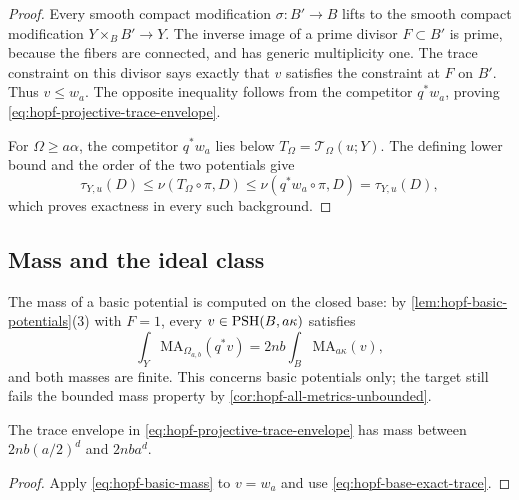 \begin{proof}
Every smooth compact modification $\sigma\colon B'\to B$ lifts to the smooth compact modification $Y\times_B B'\to Y$. The inverse image of a prime divisor $F\subset B'$ is prime, because the fibers are connected, and has generic multiplicity one. The trace constraint on this divisor says exactly that $v$ satisfies the constraint at $F$ on $B'$. Thus $v\leq w_a$. The opposite inequality follows from the competitor $q^*w_a$, proving \eqref{eq:hopf-projective-trace-envelope}.

For $\Omega\geq a\alpha$, the competitor $q^*w_a$ lies below $T_\Omega=\mathcal T_\Omega(u;Y)$. The defining lower bound and the order of the two potentials give
\[
 \tau_{Y,u}(D)\leq\nu(T_\Omega\circ\pi,D)
       \leq\nu(q^*w_a\circ\pi,D)=\tau_{Y,u}(D),
\]
which proves exactness in every such background.
\end{proof}

\subsection{Mass and the ideal class}

The mass of a basic potential is computed on the closed base: by \cref{lem:hopf-basic-potentials}(3) with $F=1$, every $v\in\mathrm{PSH}(B,a\kappa)$ satisfies
\begin{equation}\label{eq:hopf-basic-mass}
 \int_Y\mathrm{MA}_{\Omega_{a,b}}(q^*v)
       =2nb\int_B\mathrm{MA}_{a\kappa}(v),
\end{equation}
and both masses are finite. This concerns basic potentials only; the target still fails the bounded mass property by \cref{cor:hopf-all-metrics-unbounded}.

\begin{proposition}\label{prop:hopf-basic-mass}
The trace envelope in \eqref{eq:hopf-projective-trace-envelope} has mass between $2nb(a/2)^d$ and $2nba^d$.
\end{proposition}
\begin{proof}
Apply \eqref{eq:hopf-basic-mass} to $v=w_a$ and use \eqref{eq:hopf-base-exact-trace}.
\end{proof}

